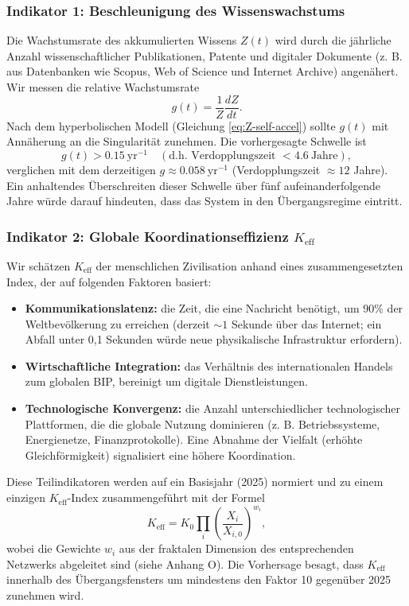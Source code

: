 \documentclass[12pt,a4paper]{article}
\theoremstyle{remark}
\begin{document}
	\subsubsection{Indikator 1: Beschleunigung des Wissenswachstums}
	
	Die Wachstumsrate des akkumulierten Wissens $Z(t)$ wird durch die jährliche Anzahl wissenschaftlicher Publikationen, Patente und digitaler Dokumente (z. B. aus Datenbanken wie Scopus, Web of Science und Internet Archive) angenähert. Wir messen die relative Wachstumsrate
	\[
	g(t) = \frac{1}{Z}\frac{dZ}{dt}.
	\]
	Nach dem hyperbolischen Modell (Gleichung \ref{eq:Z-self-accel}) sollte $g(t)$ mit Annäherung an die Singularität zunehmen. Die vorhergesagte Schwelle ist
	\[
	g(t) > 0.15\ \text{yr}^{-1} \quad (\text{d.h. Verdopplungszeit } < 4.6\ \text{Jahre}),
	\]
	verglichen mit dem derzeitigen $g\approx 0.058\ \text{yr}^{-1}$ (Verdopplungszeit $\approx 12$ Jahre). Ein anhaltendes Überschreiten dieser Schwelle über fünf aufeinanderfolgende Jahre würde darauf hindeuten, dass das System in den Übergangsregime eintritt.
	
	\subsubsection{Indikator 2: Globale Koordinationseffizienz $K_{\text{eff}}$}
	
	Wir schätzen $K_{\text{eff}}$ der menschlichen Zivilisation anhand eines zusammengesetzten Index, der auf folgenden Faktoren basiert:
	
	\begin{itemize}
		\item \textbf{Kommunikationslatenz:} die Zeit, die eine Nachricht benötigt, um 90\% der Weltbevölkerung zu erreichen (derzeit $\sim 1$ Sekunde über das Internet; ein Abfall unter 0,1 Sekunden würde neue physikalische Infrastruktur erfordern).
		\item \textbf{Wirtschaftliche Integration:} das Verhältnis des internationalen Handels zum globalen BIP, bereinigt um digitale Dienstleistungen.
		\item \textbf{Technologische Konvergenz:} die Anzahl unterschiedlicher technologischer Plattformen, die die globale Nutzung dominieren (z. B. Betriebssysteme, Energienetze, Finanzprotokolle). Eine Abnahme der Vielfalt (erhöhte Gleichförmigkeit) signalisiert eine höhere Koordination.
	\end{itemize}
	
	Diese Teilindikatoren werden auf ein Basisjahr (2025) normiert und zu einem einzigen $K_{\text{eff}}$-Index zusammengeführt mit der Formel
	\[
	K_{\text{eff}} = K_0 \prod_{i} \left(\frac{X_i}{X_{i,0}}\right)^{w_i},
	\]
	wobei die Gewichte $w_i$ aus der fraktalen Dimension des entsprechenden Netzwerks abgeleitet sind (siehe Anhang O). Die Vorhersage besagt, dass $K_{\text{eff}}$ innerhalb des Übergangsfensters um mindestens den Faktor 10 gegenüber 2025 zunehmen wird.
	
\end{document}
